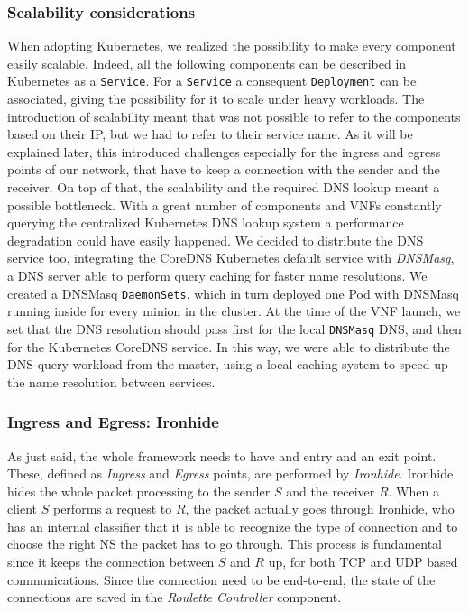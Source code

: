 \subsubsection{Scalability considerations}
When adopting Kubernetes, we realized the possibility to make every component
easily scalable. Indeed, all the following components can be described in
Kubernetes as a \verb!Service!. For a \verb!Service! a consequent
\verb!Deployment! can be associated, giving the possibility for it to scale
under heavy workloads. The introduction of scalability meant that was not
possible to refer to the components based on their IP, but we had to refer to
their service name. As it will be explained later, this introduced challenges
especially for the ingress and egress points of our network, that have to keep a
connection with the sender and the receiver. On top of that, the scalability and
the required DNS lookup meant a possible bottleneck. With a great number of
components and VNFs constantly querying the centralized Kubernetes DNS lookup
system a performance degradation could have easily happened. We decided to
distribute the DNS service too, integrating the CoreDNS Kubernetes default
service with \emph{DNSMasq}, a DNS server able to perform query caching for
faster name resolutions. We created a DNSMasq \verb!DaemonSets!, which in turn
deployed one Pod with DNSMasq running inside for every minion in the cluster. At
the time of the VNF launch, we set that the DNS resolution should pass first for
the local \verb!DNSMasq! DNS, and then for the Kubernetes CoreDNS service. In
this way, we were able to distribute the DNS query workload from the master,
using a local caching system to speed up the name resolution between services.

\subsubsection{Ingress and Egress: Ironhide}
As just said, the whole framework needs to have and entry and an exit point.
These, defined as \emph{Ingress} and \emph{Egress} points, are performed by
\emph{Ironhide}. Ironhide hides the whole packet processing to the sender $S$
and the receiver $R$. When a client $S$ performs a request to $R$, the packet
actually goes through Ironhide, who has an internal classifier that it is able
to recognize the type of connection and to choose the right NS the packet has to
go through. This process is fundamental since it keeps the connection between
$S$ and $R$ up, for both TCP and UDP based communications. Since the connection
need to be end-to-end, the state of the connections are saved in the
\emph{Roulette Controller} component.

